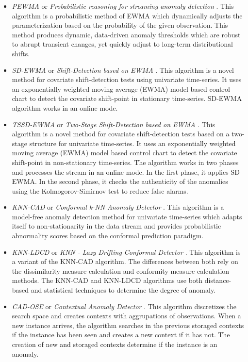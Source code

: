 \documentclass[a4paper]{article}
\begin{document}
\begin{itemize}

\item \emph{PEWMA} or \emph{Probabilistic reasoning for streaming anomaly detection} \cite{pewma}. This algorithm is a probabilistic method of EWMA which dynamically adjusts the parameterization based on the probability of the given observation. This method produces dynamic, data-driven anomaly thresholds which are robust to abrupt transient changes, yet quickly adjust to long-term distributional shifts.

\item \emph{SD-EWMA} or \emph{Shift-Detection based on EWMA} \cite{Raza}. This algorithm is a novel method for covariate shift-detection tests using univariate time-series. It uses an exponentially weighted moving average (EWMA) model based control chart to detect the covariate shift-point in stationary time-series. SD-EWMA algorithm works in an online mode.

\item \emph{TSSD-EWMA} or \emph{Two-Stage Shift-Detection based on EWMA} \cite{Raza}. This algorithm is a novel method for covariate shift-detection tests based on a two-stage structure for univariate time-series. It uses an exponentially weighted moving average (EWMA) model based control chart to detect the covariate shift-point in non-stationary time-series. The algorithm works in two phases and processes the stream in an online mode. In the first phase, it applies SD-EWMA. In the second phase, it checks the authenticity of the anomalies using the Kolmogorov-Simirnov test to reduce false alarms.

\item \emph{KNN-CAD} or \emph{Conformal k-NN Anomaly Detector} \cite{2016arXiv160804585B}. This algorithm is a model-free anomaly detection method for univariate time-series which adapts itself to non-stationarity in the data stream and provides probabilistic abnormality scores based on the conformal prediction paradigm.

\item \emph{KNN-LDCD} or \emph{KNN - Lazy Drifting Conformal Detector} \cite{2017arXiv170603412I}. This algorithm is a variant of the KNN-CAD algorithm. The differences between both rely on the dissimilarity measure calculation and conformity measure calculation methods. The KNN-CAD and KNN-LDCD algorithms use both distance-based and statistical techniques to determine the degree of anomaly.

\item \emph{CAD-OSE} or \emph{Contextual Anomaly Detector} \cite{2018-Smirnov-ContextualAnomalyDetector}. This algorithm discretizes the search space and creates contexts with aggrupations of observations. When a new instance arrives, the algorithm searches in the previous storaged contexts if the instance has been seen and creates a new context if it has not. The creation of new and storaged contexts determine if the instance is an anomaly.

\end{itemize}
\end{document}
